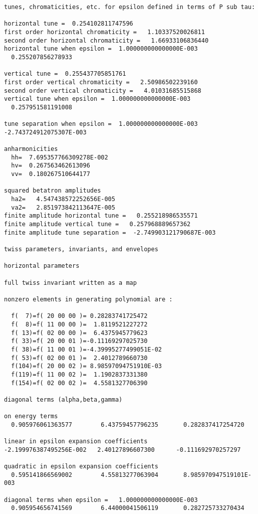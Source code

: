 \begin{footnotesize}
\begin{verbatim}
tunes, chromaticities, etc. for epsilon defined in terms of P sub tau:

horizontal tune =  0.254102811747596
first order horizontal chromaticity =   1.10337520026811
second order horizontal chromaticity =   1.66933106836440
horizontal tune when epsilon =  1.000000000000000E-003
  0.255207856278933

vertical tune =  0.255437705851761
first order vertical chromaticity =   2.50986502239160
second order vertical chromaticity =   4.01031685515868
vertical tune when epsilon =  1.000000000000000E-003
  0.257951581191008

tune separation when epsilon =  1.000000000000000E-003
-2.743724912075307E-003

anharmonicities
  hh=  7.695357766309278E-002
  hv=  0.267563462613096
  vv=  0.180267510644177

squared betatron amplitudes
  ha2=   4.547438572252656E-005
  va2=   2.851973842113647E-005
finite amplitude horizontal tune =   0.255218986535571
finite amplitude vertical tune =   0.257968889657362
finite amplitude tune separation =  -2.749903121790687E-003

twiss parameters, invariants, and envelopes

horizontal parameters

full twiss invariant written as a map

nonzero elements in generating polynomial are :

  f(  7)=f( 20 00 00 )= 0.28283741725472
  f(  8)=f( 11 00 00 )=  1.8119521227272
  f( 13)=f( 02 00 00 )=  6.4375945779623
  f( 33)=f( 20 00 01 )=-0.11169297025730
  f( 38)=f( 11 00 01 )=-4.39995277499051E-02
  f( 53)=f( 02 00 01 )=  2.4012789660730
  f(104)=f( 20 00 02 )= 8.98597094751910E-03
  f(119)=f( 11 00 02 )=  1.1902837331380
  f(154)=f( 02 00 02 )=  4.5581327706390

diagonal terms (alpha,beta,gamma)

on energy terms
  0.905976061363577        6.43759457796235       0.282837417254720

linear in epsilon expansion coefficients
-2.199976387495256E-002   2.40127896607300      -0.111692970257297

quadratic in epsilon expansion coefficients
  0.595141866569002        4.55813277063904       8.985970947519101E-003

diagonal terms when epsilon =   1.000000000000000E-003
  0.905954656741569        6.44000041506119       0.282725733270434


\end{verbatim}
\end{footnotesize}
